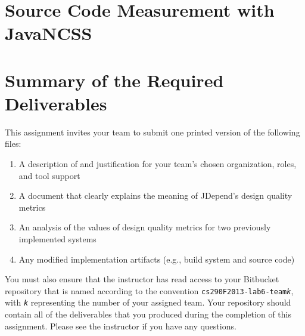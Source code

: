 \section*{Source Code Measurement with JavaNCSS}

\section*{Summary of the Required Deliverables}

This assignment invites your team to submit one printed version of the following files:
\vspace*{-.1in}
\begin{enumerate}
	\itemsep0em 
	\item A description of and justification for your team's chosen organization, roles, and tool support
	\item A document that clearly explains the meaning of JDepend's design quality metrics 
	\item An analysis of the values of design quality metrics for two previously implemented systems 
	\item Any modified implementation artifacts (e.g., build system and source code) 
\end{enumerate}
\vspace*{-.1in}

You must also ensure that the instructor has read access to your Bitbucket repository that is named according to the
convention {\tt cs290F2013-lab6-team{\em k}}, with {\tt {\em k}} representing the number of your assigned team.  Your
repository should contain all of the deliverables that you produced during the completion of this assignment.  Please
see the instructor if you have any questions.


